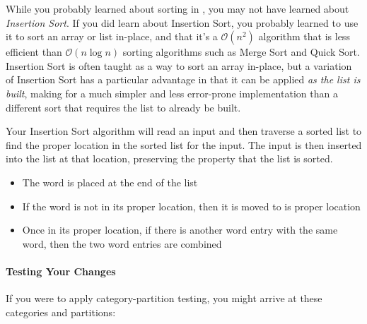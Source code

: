 While you probably learned about sorting in \cstwo, you may not have learned about \textit{Insertion Sort}.
If you did learn about Insertion Sort, you probably learned to use it to sort an array or list in-place, and that it's a $\mathcal{O}(n^2)$ algorithm that is less efficient than $\mathcal{O}(n \log n)$ sorting algorithms such as Merge Sort and Quick Sort.
Insertion Sort is often taught as a way to sort an array in-place,
but a variation of Insertion Sort has a particular advantage in that it can be applied \textit{as the list is built}, making for a much simpler and less error-prone implementation than a different sort that requires the list to already be built.

Your Insertion Sort algorithm will read an input and then traverse a sorted list to find the proper location in the sorted list for the input.
The input is then inserted into the list at that location, preserving the property that the list is sorted.

\begin{description}
    \begin{itemize}
            \item The word is placed at the end of the list
            \item If the word is not in its proper location, then it is moved to is proper location
            \item Once in its proper location, if there is another word entry with the same word, then the two word entries are combined
        \end{itemize}
\end{description}

\paragraph{Testing Your Changes}

If you were to apply category-partition testing, you might arrive at these categories and partitions:

